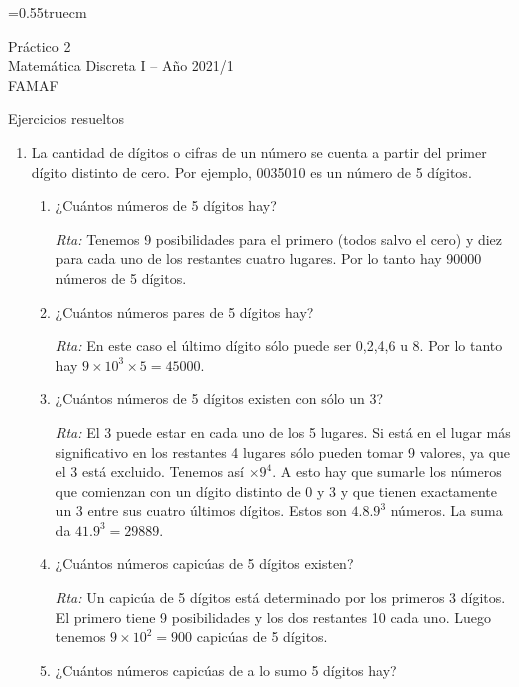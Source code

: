\documentclass[a4paper,12pt,twoside,spanish,reqno]{amsbook}
\numberwithin{equation}{section}
\begin{document}
    \baselineskip=0.55truecm %
    
{\bf \begin{center} Práctico 2 \\ Matemática Discreta I -- Año 2021/1 \\ FAMAF \end{center}}

{\bf \begin{center} Ejercicios resueltos \end{center}}

\begin{enumerate}
\setlength\itemsep{1.1em}

\item  La cantidad de dígitos o cifras de un número se cuenta a partir del primer dígito
distinto de cero. Por ejemplo, 0035010 es un número de 5 dígitos.
\begin{enumerate}
\item ¿Cuántos números de 5 dígitos hay?

\textit{Rta:} Tenemos 9 posibilidades para el primero (todos salvo el cero) y diez para cada uno de los restantes cuatro lugares. Por lo tanto hay 90000 números de 5 dígitos.

\item ¿Cuántos números pares de 5 dígitos hay?

\textit{Rta:} En este caso el último dígito sólo puede ser 0,2,4,6 u 8. Por lo tanto hay $9\times 10^3\times 5= 45000$.

\item ¿Cuántos números de 5 dígitos existen con sólo un 3?

\noindent\textit{Rta:} El 3 puede estar en cada uno de los 5 lugares. Si está en el lugar más significativo en los restantes 4 lugares sólo pueden tomar 9 valores, ya que el 3 está excluido. Tenemos así $\times 9^4.$ A esto hay que sumarle los números que comienzan con un dígito distinto de 0 y 3 y que tienen exactamente un 3 entre sus cuatro últimos dígitos. Estos son $4.8.9^3$ números. La suma da $41.9^3=29889$.

\item ¿Cuántos números capicúas de 5 dígitos existen?

\textit{Rta:} Un capicúa de 5 dígitos está determinado por los primeros 3 dígitos. El primero tiene 9 posibilidades y los dos restantes 10 cada uno. Luego tenemos $9\times 10^2=900 $ capicúas de 5 dígitos.

\item ¿Cuántos números capicúas de a lo sumo 5 dígitos hay?


\end{enumerate}
\end{enumerate}
\end{document}
